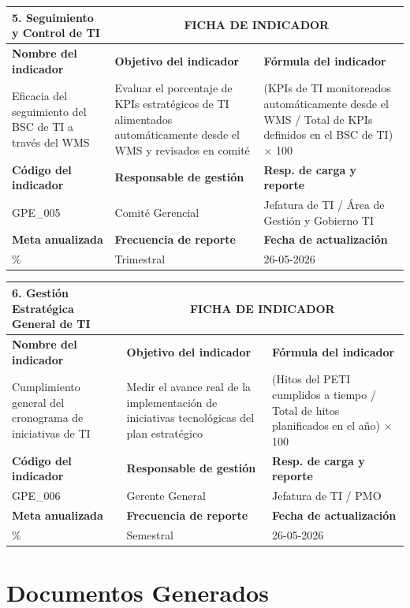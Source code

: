 \documentclass[11pt,letterpaper]{report}
\newcommand{\fichaIndicador}[9]{
  \noindent
  \begin{tabularx}{\textwidth}{p{0.25\textwidth}XX}
  \toprule
  \textbf{#1} & \multicolumn{2}{c}{\textbf{FICHA DE INDICADOR}} \\
  \midrule
  \textbf{Nombre del indicador} & \textbf{Objetivo del indicador} & \textbf{Fórmula del indicador} \\
  #2 & #3 & #4 \\
  \midrule
  \textbf{Código del indicador} & \textbf{Responsable de gestión} & \textbf{Resp. de carga y reporte} \\
  #5 & #6 & #7 \\
  \midrule
  \textbf{Meta anualizada} & \textbf{Frecuencia de reporte} & \textbf{Fecha de actualización} \\
  #8 & #9 & 26-05-2026 \\
  \bottomrule
  \end{tabularx}
  \vspace{1.5em}
}
\begin{document}
\fichaIndicador{5. Seguimiento y Control de TI}{Eficacia del seguimiento del BSC de TI a través del WMS}{Evaluar el porcentaje de KPIs estratégicos de TI alimentados automáticamente desde el WMS y revisados en comité}{(KPIs de TI monitoreados automáticamente desde el WMS / Total de KPIs definidos en el BSC de TI) $\times$ 100}{GPE\_005}{Comité Gerencial}{Jefatura de TI / Área de Gestión y Gobierno TI}{\ge 90\%}{Trimestral}

\fichaIndicador{6. Gestión Estratégica General de TI}{Cumplimiento general del cronograma de iniciativas de TI}{Medir el avance real de la implementación de iniciativas tecnológicas del plan estratégico}{(Hitos del PETI cumplidos a tiempo / Total de hitos planificados en el año) $\times$ 100}{GPE\_006}{Gerente General}{Jefatura de TI / PMO}{\ge 85\%}{Semestral}

\newpage

\chapter{Documentos Generados}
\end{document}
